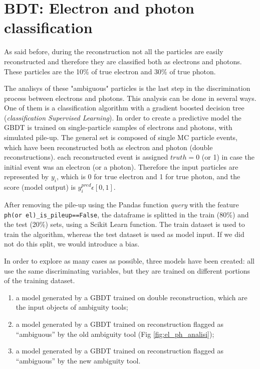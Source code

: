 \documentclass[a4paper, oneside, 11pt, openright]{book}
\begin{document}
	\chapter{BDT: Electron and photon classification}	
		As said before, during the reconstruction not all the particles are easily reconstructed and therefore they are classified both as electrons and photons. These particles are the 10\% of true electron and 30\% of true photon. 
		
		The analisys of these "ambiguous" particles is the last step in the discrimination process between electrons and photons. This analysis can be done in several ways. One of them is a classification algorithm with a gradient boosted decision tree (\textit{classification Supervised Learning}). In order to create a predictive model the GBDT is trained on single-particle samples of electrons and photons, with simulated pile-up. The general set is composed of single MC particle events, which have been reconstructed both as electron and photon (double reconstructions). each reconstructed event is assigned $truth=$0 (or 1) in case the initial event was an electron (or a photon). Therefore the input particles are represented by $y_i$, which is 0 for true electron and 1 for true photon, and the score (model output) is $y_i^{pred} \epsilon [0,1]$.
		
		After removing the pile-up using the Pandas \cite{Pandas} function \textit{query} with the feature \texttt{ph(or el)\_is\_pileup==False}, the dataframe is splitted in the train (80\%) and the test (20\%) sets, using a Scikit Learn \cite{SKlearn} function. The train dataset is used to train the algorithm, whereas the test dataset is used as model input. If we did not do this split, we would introduce a bias.
		
		In order to explore as many cases as possible, three models have been created: all use the same discriminating variables, but they are trained on different portions of the training dataset.
		\begin{enumerate}
			\item a model generated by a GBDT trained on double reconstruction, which are the input objects of ambiguity tools;
			\item a model generated by a GBDT trained on reconstruction flagged as “ambiguous” by the old ambiguity tool (Fig \ref{fig:el_ph_analisi});
			\item a model generated by a GBDT trained on reconstruction flagged as “ambiguous” by the new ambiguity tool.
		\end{enumerate}
		
\end{document}

